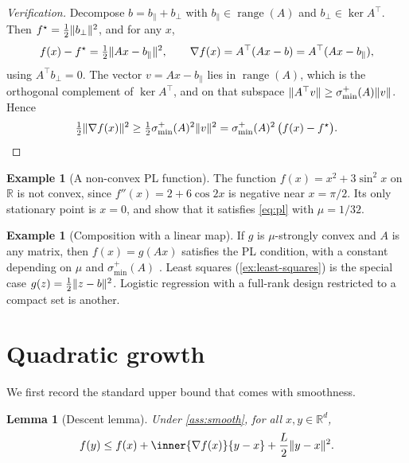 \documentclass[11pt,a4paper,oneside]{report}
\theoremstyle{plain}
\newtheorem{lemma}[theorem]{Lemma}
\theoremstyle{definition}
\newtheorem{example}[theorem]{Example}
\theoremstyle{remark}
\newcommand{\R}{\mathbb{R}}
\DeclarePairedDelimiter{\norm}{\lVert}{\rVert}
\begin{document}
\begin{proof}[Verification]
Decompose $b = b_\parallel + b_\perp$ with $b_\parallel\in\operatorname{range}(A)$ and $b_\perp\in\ker A^\top$. Then $f^\star = \frac12\norm{b_\perp}^2$, and for any $x$,
\[
  f(x) - f^\star = \tfrac12\norm{Ax - b_\parallel}^2, \qquad
  \nabla f(x) = A^\top(Ax - b) = A^\top(Ax - b_\parallel),
\]
using $A^\top b_\perp = 0$. The vector $v = Ax - b_\parallel$ lies in $\operatorname{range}(A)$, which is the orthogonal complement of $\ker A^\top$, and on that subspace $\norm{A^\top v} \ge \sigma_{\min}^{+}(A)\norm{v}$. Hence
\[
  \tfrac12\norm{\nabla f(x)}^2 \ge \tfrac12\sigma_{\min}^{+}(A)^2\norm{v}^2 = \sigma_{\min}^{+}(A)^2\,\bigl(f(x) - f^\star\bigr). \qedhere
\]
\end{proof}

\begin{example}[A non-convex PL function]\label{ex:nonconvex}
The function $f(x) = x^2 + 3\sin^2 x$ on $\R$ is not convex, since $f''(x) = 2 + 6\cos 2x$ is negative near $x = \pi/2$. Its only stationary point is $x = 0$, and \citet{karimi2016} show that it satisfies \eqref{eq:pl} with $\mu = 1/32$.
\end{example}

\begin{example}[Composition with a linear map]\label{ex:composition}
If $g$ is $\mu$-strongly convex and $A$ is any matrix, then $f(x) = g(Ax)$ satisfies the PL condition, with a constant depending on $\mu$ and $\sigma_{\min}^+(A)$ \citep{karimi2016}. Least squares (\cref{ex:least-squares}) is the special case $g(z) = \frac12\norm{z - b}^2$. Logistic regression with a full-rank design restricted to a compact set is another.
\end{example}

\section{Quadratic growth}
\label{sec:pl-qg}

We first record the standard upper bound that comes with smoothness.

\begin{lemma}[Descent lemma]\label{lem:descent}
Under \cref{ass:smooth}, for all $x, y\in\R^d$,
\begin{equation}\label{eq:descent}
  f(y) \le f(x) + \inner{\nabla f(x)}{y - x} + \frac{L}{2}\norm{y - x}^2.
\end{equation}
\end{lemma}
\end{document}
